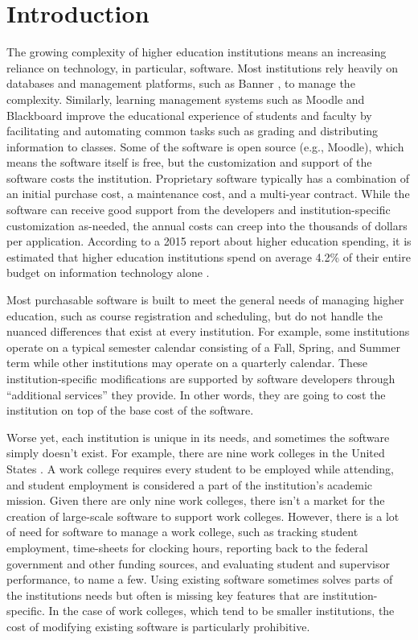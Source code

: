\section{Introduction}

The growing complexity of higher education institutions means an increasing reliance on technology, in particular, software. Most institutions rely heavily on databases and management platforms, such as Banner \cite{BannerWebsite}, to manage the complexity. Similarly, learning management systems such as Moodle \cite{MoodleWebsite} and Blackboard \cite{BlackboardWebsite} improve the educational experience of students and faculty by facilitating and automating common tasks such as grading and distributing information to classes. Some of the software is open source (e.g., Moodle), which means the software itself is free, but the customization and support of the software costs the institution. Proprietary software typically has a combination of an initial purchase cost, a maintenance cost, and a multi-year contract. While the software can receive good support from the developers and institution-specific customization as-needed, the annual costs can creep into the thousands of dollars per application. According to a 2015 report about higher education spending, it is estimated that higher education institutions spend on average 4.2\% of their entire budget on information technology alone \cite{CDSBenchmarkReport}.

Most purchasable software is built to meet the general needs of managing higher education, such as course registration and scheduling, but do not handle the nuanced differences that exist at every institution. For example, some institutions operate on a typical semester calendar consisting of a Fall, Spring, and Summer term while other institutions may operate on a quarterly calendar. These institution-specific modifications are supported by software developers through ``additional services'' they provide. In other words, they are going to cost the institution on top of the base cost of the software.

Worse yet, each institution is unique in its needs, and sometimes the software simply doesn't exist. For example, there are nine work colleges in the United States \cite{WCCMembers, Ecclesia}. A work college requires every student to be employed while attending, and student employment is considered a part of the institution's academic mission. Given there are only nine work colleges, there isn't a market for the creation of large-scale software to support work colleges. However, there is a lot of need for software to manage a work college, such as tracking student employment, time-sheets for clocking hours, reporting back to the federal government and other funding sources, and evaluating student and supervisor performance, to name a few. Using existing software sometimes solves parts of the institutions needs but often is missing key features that are institution-specific. In the case of work colleges, which tend to be smaller institutions, the cost of modifying existing software is particularly prohibitive.

